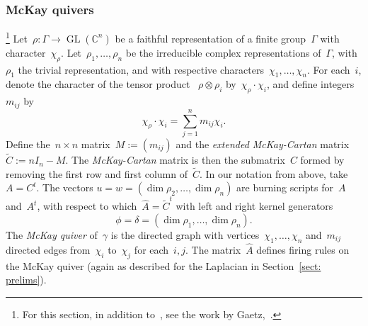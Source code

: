 \documentclass{amsart}
\DeclareMathOperator{\Div}{Div}
\DeclareMathOperator{\GL}{GL}
\newcommand{\C}{\mathbb{C}}
\newcommand{\K}{\mathcal{K}}
\newcommand{\wA}{\widehat{A}}
\begin{document}
%
%
%
%
\subsubsection{McKay quivers}\footnote{For this section, in addition to~\cite{BKR}, see the work by
Gaetz,~\cite{Gaetz}.}
Let~$\rho\colon\Gamma\to\GL(\C^n)$ be a faithful representation of a finite
group~$\Gamma$ with character~$\chi_{\rho}$.
Let~$\rho_1,\dots,\rho_n$ be the irreducible complex representations
of~$\Gamma$, with~$\rho_1$ the trivial representation, and with respective
characters~$\chi_1,\dots,\chi_n$.  For each~$i$,
denote the character of the tensor product
~$\rho\otimes\rho_i$ by~$\chi_{\rho}\cdot\chi_i$, and define integers~$m_{ij}$ by
\[
  \chi_{\rho}\cdot\chi_i=\sum_{j=1}^nm_{ij}\chi_i.
\]
Define the~$n\times n$ matrix~$M:=(m_{ij})$ and the
{\em extended McKay-Cartan} matrix~$\widetilde{C}:=nI_n-M$.  The {\em McKay-Cartan}
matrix is then the submatrix~$C$ formed by removing the first row and first column
of~$\widetilde{C}$.  In our notation from above, take~$A=C^t$.  The vectors
$u=w=(\dim\rho_2,\dots,\dim\rho_n)$ are burning scripts for~$A$ and~$A^t$, with
respect to which~$\wA=\widetilde{C}^t$ with left and right kernel generators
\[
  \phi = \delta = (\dim\rho_1,\dots,\dim\rho_n).
\]
The {\em McKay quiver} of~$\gamma$ is the directed graph with
vertices~$\chi_1,\dots,\chi_n$ and~$m_{ij}$ directed edges from~$\chi_i$
to~$\chi_j$ for each~$i,j$.  The matrix~$\wA$ defines firing rules on the McKay
quiver (again as described for the Laplacian in Section~\ref{sect: prelims}).
\end{document}
